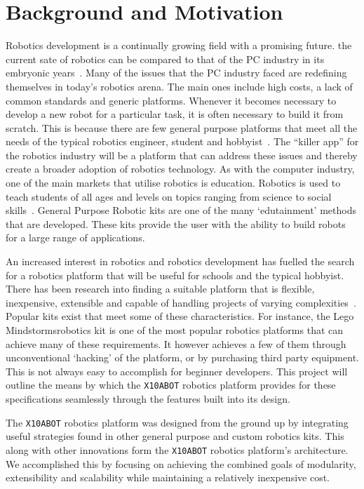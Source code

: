 \chapter{Background and Motivation} %
\label{cha:background_and_motivation}

Robotics development is a continually growing field with a promising future. the
current sate of robotics can be compared to that of the PC industry in its
embryonic years~\parencite{billgates}. Many of the issues that the PC industry faced are redefining
themselves in today's robotics arena. The main ones include high costs, a lack
of common standards and generic platforms. Whenever it becomes necessary to
develop a new robot for a particular task, it is often necessary to build
it from scratch. This is because there are few general purpose platforms that meet
all the needs of the typical robotics engineer, student and hobbyist~\parencite{r2p}. The
``killer app'' for the robotics industry will be a platform that can address these issues
and thereby create a broader adoption of robotics technology. As with the
computer industry, one of the main markets that utilise robotics is education.
Robotics is used to teach students of all ages and levels on topics ranging from
science to social skills~\parencite{kramer}. General Purpose Robotic kits are one of the many
`edutainment' methods that are developed. These kits provide the user with the
ability to build robots for a large range of applications.

An increased interest in robotics and robotics development has fuelled 
the search for a robotics platform that will be useful for schools and the 
typical hobbyist. There has been research into finding a suitable
platform that is flexible, inexpensive, extensible and capable of handling
projects of varying complexities~\parencite{bot-mate}. Popular kits exist that meet some of
these characteristics. For instance, the Lego Mindstorms\texttrademark  robotics
kit is one of the most popular robotics platforms that can achieve many of these
requirements. It however achieves a few of them through unconventional
`hacking' of the platform, or by purchasing third party equipment. This is not
always easy to accomplish for beginner developers. This project will outline
the means by which the \texttt{X10ABOT} robotics platform provides for these
specifications seamlessly through the features built into its design.

The \texttt{X10ABOT} robotics platform  was designed from the ground up by integrating useful strategies
found in other general purpose and custom robotics kits. This along
with other innovations form the \texttt{X10ABOT} robotics platform's
architecture. We accomplished this by focusing on achieving the combined goals of modularity, 
extensibility and scalability while maintaining a relatively inexpensive cost.


